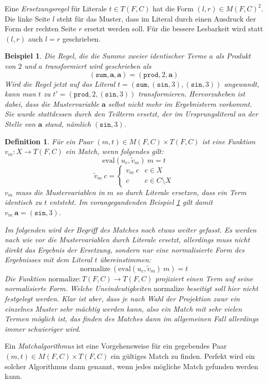 Eine \emph{Ersetzungsregel} für Literale $t \in T(F, C)$ hat die Form $(l, r) \in M(F, C)^2$. Die linke Seite $l$ steht für das Muster, dass im Literal durch einen Ausdruck der Form der rechten Seite $r$ ersetzt werden soll. Für die bessere Lesbarkeit wird statt $(l, r)$ auch $l = r$ geschrieben.

\newtheorem{bMuster}[bsp]{Beispiel} 
\begin{bMuster} \label{bMuster}
Die Regel, die die Summe zweier identischer Terme $a$ als Produkt von $2$ und $a$ transformiert wird geschrieben als
$$(\texttt{sum}, \mathbf a, \mathbf a) = (\texttt{prod}, 2, \mathbf a)$$
Wird die Regel jetzt auf das Literal 
$t = (\texttt{sum}, (\texttt{sin}, 3), (\texttt{sin}, 3))$ angewandt, kann man $t$ zu $t' = (\texttt{prod}, 2, (\texttt{sin}, 3))$ transformieren. 
Hervorzuheben ist dabei, dass die Mustervariable $\mathbf a$ selbst nicht mehr im Ergebnisterm vorkommt. Sie wurde stattdessen durch den Teilterm ersetzt, der im Ursprungsliteral an der Stelle von $\mathbf a$ stand, nämlich $(\texttt{sin}, 3)$.
\end{bMuster}

\newtheorem{defMatch}[bsp]{Definition}
\begin{defMatch}
Für ein Paar $(m, t) \in M(F, C) \times T(F, C)$ ist eine Funktion $v_m \colon X \rightarrow T(F, C)$ ein \emph{Match}, wenn folgendes gilt:
$$\mathrm{eval}(u_c, \tilde v_m)~ m = t$$
$$\tilde v_m~ c = \begin{cases}
	v_m~ c & c \in X\\
	c      & c \in C \setminus X
\end{cases}$$
$v_m$ muss die Mustervariablen in $m$ so durch Literale ersetzen, dass ein Term identisch zu $t$ entsteht. 
Im vorangegandenden Beispiel \ref{bMuster} gilt damit $v_m~ \mathbf a = (\texttt{sin}, 3)$.

Im folgenden wird der Begriff des Matches noch etwas weiter gefasst. Es werden nach wie vor die Mustervariablen durch Literale ersetzt, allerdings muss nicht direkt das Ergebnis der Ersetzung, sondern nur eine normalisierte Form des Ergebnisses mit dem Literal $t$ übereinstimmen:
$$\mathrm{normalize}~(\mathrm{eval}(u_c, \tilde v_m)~ m) = t$$
Die Funktion $\mathrm{normalize} \colon T(F, C) \rightarrow T(F, C)$ projiziert einen Term auf seine normalisierte Form. Welche Uneindeutigkeiten $\mathrm{normalize}$ beseitigt soll hier nicht festgelegt werden. Klar ist aber, dass je nach Wahl der Projektion zwar ein einzelnes Muster sehr mächtig werden kann, also ein Match mit sehr vielen Termen möglich ist, das finden des Matches dann im allgemeinen Fall allerdings immer schwieriger wird.
\end{defMatch}

Ein \emph{Matchalgorithmus} ist eine Vorgehensweise für ein gegebendes Paar $(m, t) \in M(F, C) \times T(F, C)$ ein gültiges Match zu finden. Perfekt wird ein solcher Algorithmus dann genannt, wenn jedes mögliche Match gefunden werden kann.


